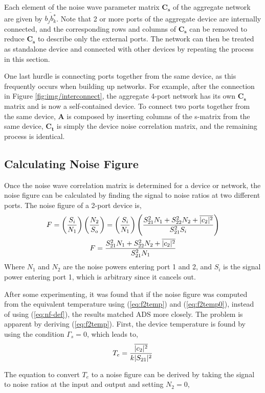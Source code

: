 \documentclass[journal]{IEEEtran}
\newcommand{\nwcv}[2]{\overline{#1#2^*}}
\newcommand{\nwv}[1]{\overline{|#1|^2}}
\begin{document}
Each element of the noise wave parameter matrix \(\mathbf{C_s}\) of the aggregate network are given by \(\nwcv{b_j}{b_k}\). Note that 2 or more ports of the aggregate device are internally connected, and the corresponding rows and columns of \(\mathbf{C_s}\) can be removed to reduce \(\mathbf{C_s}\) to describe only the external ports. The network can then be treated as standalone device and connected with other devices by repeating the process in this section.

One last hurdle is connecting ports together from the same device, as this frequently occurs when building up networks. For example, after the connection in Figure \ref{fig:img/interconnect}, the aggregate 4-port network has its own \(\mathbf{C_s}\) matrix and is now a self-contained device. To connect two ports together from the same device, \(\mathbf{A}\) is composed by inserting columns of the s-matrix from the same device, \(\mathbf{C_t}\) is simply the device noise correlation matrix, and the remaining process is identical.

\subsection{Calculating Noise Figure}
Once the noise wave correlation matrix is determined for a device or network, the noise figure can be calculated by finding the signal to noise ratios at two different ports. The noise figure of a 2-port device is,
\begin{gather}
F = \left(\frac{S_i}{N_1}\right) \left(\frac{N_2}{S_o}\right) = \left(\frac{S_i}{N_1}\right) \left(\frac{S_{21}^2 N_1 +S_{22}^2 N_2+ \nwv{c_2}}{S_{21}^2 S_i}\right) \notag \\
F = \frac{S_{21}^2 N_1 +S_{22}^2 N_2+ \nwv{c_2}}{S_{21}^2 N_1} \label{eq:nf-def} 
\end{gather}
Where \(N_1\) and \(N_2\) are the noise powers entering port 1 and 2, and \(S_i\) is the signal power entering port 1, which is arbitrary since it cancels out.

After some experimenting, it was found that if the noise figure was computed from the equivalent temperature using  (\ref{eq:f2temp}) and (\ref{eq:f2temp0}), instead of using (\ref{eq:nf-def}), the results matched ADS more closely. The problem is apparent by deriving (\ref{eq:f2temp}). First, the device temperature is found by using the condition \(\Gamma_s = 0\), which leads to,
\[T_e = {\nwv{c_2} \over k|S_{21}|^2}\]

The equation to convert \(T_e\) to a noise figure can be derived by taking the signal to noise ratios at the input and output and setting \(N_2 = 0\),
\end{document}
